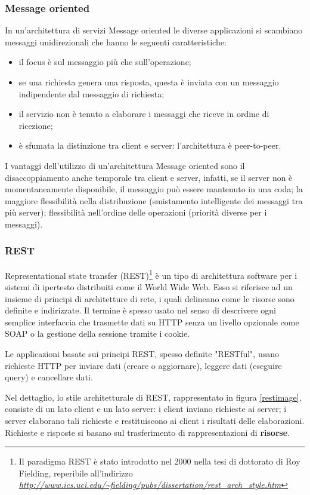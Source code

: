 \subsubsection{Message oriented}
In un'architettura di servizi Message oriented le diverse applicazioni si scambiano messaggi unidirezionali che hanno le seguenti caratteristiche:
\begin{itemize}
\item il focus è sul messaggio più che sull'operazione;
\item se una richiesta genera una risposta, questa è inviata con un messaggio indipendente dal messaggio di richiesta;
\item il servizio non è tenuto a elaborare i messaggi che riceve in ordine di ricezione;
\item è sfumata la distinzione tra client e server: l'architettura è peer-to-peer.
\end{itemize}

I vantaggi dell'utilizzo di un'architettura Message oriented sono il disaccoppiamento anche temporale tra client e server, infatti, se il server non è momentaneamente disponibile, il messaggio può essere mantenuto in una coda; la maggiore flessibilità nella distribuzione (smistamento intelligente dei messaggi tra più server); flessibilità nell'ordine delle operazioni (priorità diverse per i messaggi).

\subsubsection{REST}
Representational state transfer (REST)\footnote{Il paradigma REST è stato introdotto nel 2000 nella tesi di dottorato di Roy Fielding, reperibile all'indirizzo \emph{\url{http://www.ics.uci.edu/~fielding/pubs/dissertation/rest_arch_style.htm}}} è un tipo di architettura software per i sistemi di ipertesto distribuiti come il World Wide Web.
Esso si riferisce ad un insieme di principi di architetture di rete, i quali delineano come le risorse sono definite e indirizzate. Il termine è spesso usato nel senso di descrivere ogni semplice interfaccia che trasmette dati su HTTP senza un livello opzionale come SOAP o la gestione della sessione tramite i cookie.

Le applicazioni basate sui principi REST, spesso definite "RESTful", usano richieste HTTP per inviare dati (creare o aggiornare), leggere dati (eseguire query) e cancellare dati.

Nel dettaglio, lo stile architetturale di REST, rappresentato in figura \ref{restimage}, consiste di un lato client e un lato server: i client inviano richieste ai server; i server elaborano tali richieste e restituiscono ai client i risultati delle elaborazioni.
Richieste e risposte si basano sul trasferimento di rappresentazioni di \textbf{risorse}.

